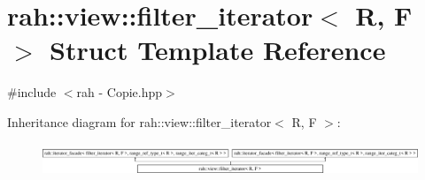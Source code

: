 \hypertarget{structrah_1_1view_1_1filter__iterator}{}\section{rah\+::view\+::filter\+\_\+iterator$<$ R, F $>$ Struct Template Reference}
\label{structrah_1_1view_1_1filter__iterator}


{\ttfamily \#include $<$rah -\/ Copie.\+hpp$>$}

Inheritance diagram for rah\+::view\+::filter\+\_\+iterator$<$ R, F $>$\+:\begin{figure}[H]
\begin{center}
\leavevmode
\includegraphics[height=0.998218cm]{structrah_1_1view_1_1filter__iterator}
\end{center}
\end{figure}
